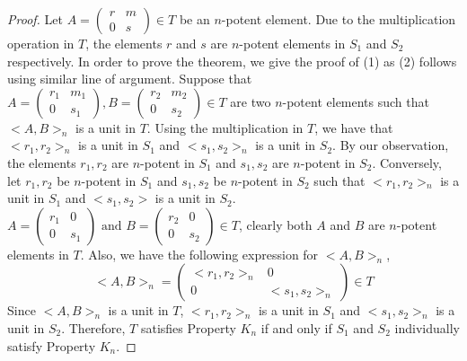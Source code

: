 \documentclass[10pt,a4paper]{amsart}
\begin{document}
 \begin{proof}
     Let $A=\begin{pmatrix}
         r&m\\
         0&s
     \end{pmatrix} \in T$ be an $n$-potent element. Due to the multiplication operation in $T$, the elements $r$ and $s$ are $n$-potent elements in $S_1$ and $S_2$ respectively. In order to prove the theorem, we give the proof of (1) as (2) follows using similar line of argument. Suppose that $A=\begin{pmatrix}
         r_1 & m_1\\
         0 & s_1
     \end{pmatrix}, B=\begin{pmatrix}
         r_2&m_2\\
         0&s_2
     \end{pmatrix} \in T$ are two $n$-potent elements such that $<A,B>_n$ is a unit in $T$. Using the multiplication in $T$, we have that $<r_1,r_2>_n$ is a unit in $S_1$ and $<s_1,s_2>_n$ is a unit in $S_2$. By our observation, the elements $r_1,r_2$ are $n$-potent in $S_1$ and $s_1,s_2$ are $n$-potent in $S_2$.  Conversely, let $r_1,r_2$ be $n$-potent in $S_1$ and $s_1,s_2$ be $n$-potent in $S_2$ such that $<r_1,r_2>_n$ is a unit in $S_1$ and $<s_1,s_2>$ is a unit in $S_2$.  $ A=\begin{pmatrix}
         r_1 & 0\\
         0 & s_1
     \end{pmatrix} \text{ and } B=\begin{pmatrix}
         r_2&0\\
         0&s_2
     \end{pmatrix} \in T$, clearly both $A$ and $B$ are $n$-potent elements in $T$. Also, we have the following expression for $<A,B>_n$,
     $$<A,B>_n=\begin{pmatrix}
         <r_1,r_2>_n &0\\
         0&<s_1,s_2>_n
     \end{pmatrix} \in T$$
Since $<A,B>_n$ is a unit in $T$, $<r_1,r_2>_n$ is a unit in $S_1$ and $<s_1,s_2>_n$ is a unit in $S_2$. Therefore, $T$ satisfies Property $K_n$ if and only if $S_1$ and $S_2$ individually satisfy Property $K_n$. 
 \end{proof}
\end{document}
